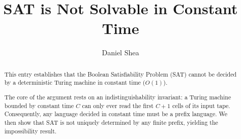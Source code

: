 \documentclass[11pt,a4paper]{article}
\begin{document}
\title{SAT is Not Solvable in Constant Time}
\author{Daniel Shea}
\maketitle

\begin{abstract}
This entry establishes that the Boolean Satisfiability Problem (SAT) cannot be 
decided by a deterministic Turing machine in constant time ($O(1)$). 

The core of the argument rests on an indistinguishability invariant: a Turing 
machine bounded by constant time $C$ can only ever read the first $C+1$ cells 
of its input tape. Consequently, any language decided in constant time must be a 
prefix language. We then show that SAT is not uniquely determined by any finite 
prefix, yielding the impossibility result.
\end{abstract}

\tableofcontents





\end{document}
